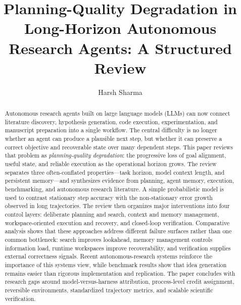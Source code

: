 \documentclass[manuscript,screen]{acmart}
\title{Planning-Quality Degradation in Long-Horizon Autonomous Research Agents: A Structured Review}
\author{Harsh Sharma}
\affiliation{\institution{[Add Department / University]}\city{[City]}\country{India}}
\begin{document}
\begin{abstract}
Autonomous research agents built on large language models (LLMs) can now connect literature discovery, hypothesis generation, code execution, experimentation, and manuscript preparation into a single workflow. The central difficulty is no longer whether an agent can produce a plausible next step, but whether it can preserve a correct objective and recoverable state over many dependent steps. This paper reviews that problem as \emph{planning-quality degradation}: the progressive loss of goal alignment, useful state, and reliable execution as the operational horizon grows. The review separates three often-conflated properties---task horizon, model context length, and persistent memory---and synthesizes evidence from planning, agent memory, execution, benchmarking, and autonomous research literature. A simple probabilistic model is used to contrast stationary step accuracy with the non-stationary error growth observed in long trajectories. The review then organizes major interventions into four control layers: deliberate planning and search, context and memory management, workspace-oriented execution and recovery, and closed-loop verification. Comparative analysis shows that these approaches address different failure surfaces rather than one common bottleneck: search improves lookahead, memory management controls information load, runtime workspaces improve recoverability, and verification supplies external correctness signals. Recent autonomous-research systems reinforce the importance of this systems view, while benchmark results show that idea generation remains easier than rigorous implementation and replication. The paper concludes with research gaps around model-versus-harness attribution, process-level credit assignment, reversible environments, standardized trajectory metrics, and scalable scientific verification.
\end{abstract}


\maketitle
\end{document}
